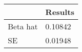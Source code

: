 \begin{tabular}{ll}
& Results \\ 
\hline 
Beta hat & 0.10842 \\ 
SE & 0.01948 \\ 
\hline 
\end{tabular}